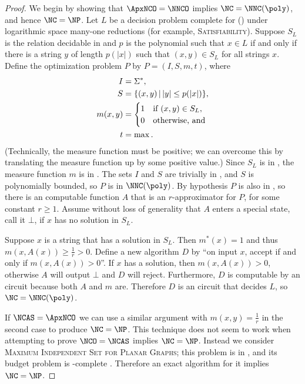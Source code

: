\documentclass[]{article}
\let\originalleft\left
\let\originalright\right
\renewcommand{\left}{\mathopen{}\mathclose\bgroup\originalleft}
\renewcommand{\right}{\aftergroup\egroup\originalright}
\begin{document}
\begin{proof}
  We begin by showing that $\ApxNCO = \NNCO$ implies $\NC = \NNC(\poly)$, and hence $\NC = \NP$.
  Let $L$ be a decision problem complete for \NNC(\poly) under logarithmic space many-one reductions (for example, \textsc{Satisfiability}).
  Suppose $S_L$ is the relation decidable in \NC{} and $p$ is the polynomial such that $x \in L$ if and only if there is a string $y$ of length $p(|x|)$ such that $(x, y) \in S_L$ for all strings $x$.
  Define the optimization problem $P$ by $P = (I, S, m, t)$, where
  \begin{align*}
    I & = \Sigma^*, \\
    S & = \left\{ (x, y) \,\middle|\, |y| \leq p(|x|) \right\}, \\
    m(x, y) & =
    \begin{cases}
      1 & \text{if } (x, y) \in S_L, \\
      0 & \text{otherwise, and}
    \end{cases} \\
    t & = \max.
  \end{align*}
  (Technically, the measure function must be positive; we can overcome this by translating the measure function up by some positive value.)
  Since $S_L$ is in \NC, the measure function $m$ is in \FNC.
  The sets $I$ and $S$ are trivially in \NC, and $S$ is polynomially bounded, so $P$ is in $\NNC(\poly)$.
  By hypothesis $P$ is also in \ApxNCO, so there is an \NC{} computable function $A$ that is an $r$-approximator for $P$, for some constant $r \geq 1$.
  Assume without loss of generality that $A$ enters a special state, call it $\bot$, if $x$ has no solution in $S_L$.

  Suppose $x$ is a string that has a solution in $S_L$.
  Then $m^*(x) = 1$ and thus $m(x, A(x)) \geq \frac{1}{r} > 0$.
  Define a new algorithm $D$ by ``on input $x$, accept if and only if $m(x, A(x)) > 0$''.
  If $x$ has a solution, then $m(x, A(x)) > 0$, otherwise $A$ will output $\bot$ and $D$ will reject.
  Furthermore, $D$ is computable by an \NC{} circuit because both $A$ and $m$ are.
  Therefore $D$ is an \NC circuit that decides $L$, so $\NC = \NNC(\poly)$.

  If $\NCAS = \ApxNCO$ we can use a similar argument with $m(x, y) = \frac{1}{r}$ in the second case to produce $\NC = \NP$.
  This technique does not seem to work when attempting to prove $\NCO = \NCAS$ implies $\NC = \NP$.
  Instead we consider \textsc{Maximum Independent Set for Planar Graphs}; this problem is in \NCAS{} \cite[Theorem~5.2.1]{dsst97}, and its budget problem is \NP-complete \cite{gj79}.
  Therefore an exact \NC{} algorithm for it implies $\NC = \NP$.
\end{proof}
\end{document}
